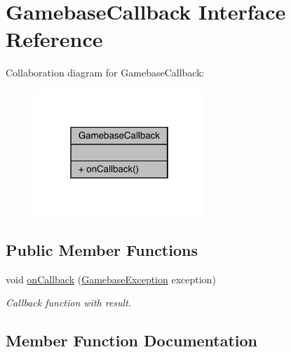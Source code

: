 \hypertarget{interfacecom_1_1toast_1_1android_1_1gamebase_1_1_gamebase_callback}{}\section{Gamebase\+Callback Interface Reference}
\label{interfacecom_1_1toast_1_1android_1_1gamebase_1_1_gamebase_callback}


Collaboration diagram for Gamebase\+Callback\+:
\nopagebreak
\begin{figure}[H]
\begin{center}
\leavevmode
\includegraphics[width=183pt]{interfacecom_1_1toast_1_1android_1_1gamebase_1_1_gamebase_callback__coll__graph}
\end{center}
\end{figure}
\subsection*{Public Member Functions}
\begin{DoxyCompactItemize}
\item 
void \hyperlink{interfacecom_1_1toast_1_1android_1_1gamebase_1_1_gamebase_callback_a810f2920c5b907c7667a4f097b7c6dca}{on\+Callback} (\hyperlink{classcom_1_1toast_1_1android_1_1gamebase_1_1base_1_1_gamebase_exception}{Gamebase\+Exception} exception)
\begin{DoxyCompactList}\small\item\em Callback function with result. \end{DoxyCompactList}\end{DoxyCompactItemize}


\subsection{Member Function Documentation}
\mbox{\label{interfacecom_1_1toast_1_1android_1_1gamebase_1_1_gamebase_callback_a810f2920c5b907c7667a4f097b7c6dca}} 
